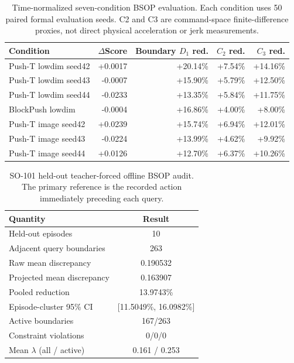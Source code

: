 
\begin{table}[t]
\centering
\caption{Time-normalized seven-condition BSOP evaluation. Each condition uses
50 paired formal evaluation seeds. C2 and C3 are command-space finite-difference
proxies, not direct physical acceleration or jerk measurements.}
\label{tab:bsop-seven-condition}
\begin{tabular}{lrrrr}
\toprule
Condition & $\Delta$Score & Boundary $D_1$ red. & $C_2$ red. & $C_3$ red. \\
\midrule
Push-T lowdim seed42 & +0.0017 & +20.14\% & +7.54\% & +14.16\% \\
Push-T lowdim seed43 & -0.0007 & +15.90\% & +5.79\% & +12.50\% \\
Push-T lowdim seed44 & -0.0233 & +13.35\% & +5.84\% & +11.75\% \\
BlockPush lowdim & -0.0004 & +16.86\% & +4.00\% & +8.00\% \\
Push-T image seed42 & +0.0239 & +15.74\% & +6.94\% & +12.01\% \\
Push-T image seed43 & -0.0224 & +13.99\% & +4.62\% & +9.92\% \\
Push-T image seed44 & +0.0126 & +12.70\% & +6.37\% & +10.26\% \\
\bottomrule
\end{tabular}
\end{table}

\begin{table}[t]
\centering
\caption{SO-101 held-out teacher-forced offline BSOP audit. The primary
reference is the recorded action immediately preceding each query.}
\label{tab:so101-offline-audit}
\begin{tabular}{lc}
\toprule
Quantity & Result \\
\midrule
Held-out episodes & 10 \\
Adjacent query boundaries & 263 \\
Raw mean discrepancy & 0.190532 \\
Projected mean discrepancy & 0.163907 \\
Pooled reduction & 13.9743\% \\
Episode-cluster 95\% CI & [11.5049\%, 16.0982\%] \\
Active boundaries & 167/263 \\
Constraint violations & 0/0/0 \\
Mean $\lambda$ (all / active) & 0.161 / 0.253 \\
\bottomrule
\end{tabular}
\end{table}

